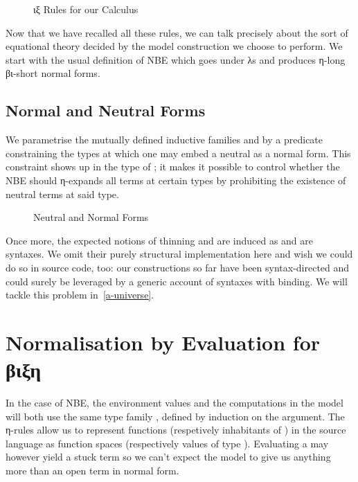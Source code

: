 \begin{figure}[h]
\caption{ιξ Rules for our Calculus\label{fig:iotaxirules}}
\end{figure}

Now that we have recalled all these rules, we can talk precisely about the
sort of equational theory decided by the model construction we choose to
perform. We start with the usual definition of NBE
which goes under λs and produces η-long βι-short normal forms.

\subsection{Normal and Neutral Forms}

We parametrise the mutually defined inductive families  and 
by a predicate  constraining the types at which one may embed a neutral
as a normal form. This constraint shows up in the type of ; it makes
it possible to control whether the NBE should η-expands all terms at certain
types by prohibiting the existence of neutral terms at said type.

\begin{figure}[h]
\caption{Neutral and Normal Forms}
\end{figure}

Once more, the expected notions of thinning  and
 are induced as  and  are syntaxes.
We omit their purely
structural implementation here and wish we could do so in source code,
too: our constructions so far have been syntax-directed and could
surely be leveraged by a generic account of syntaxes with binding.
We will tackle this problem in~\cref{a-universe}.

\section{Normalisation by Evaluation for βιξη}
\label{normbye}

In the case of NBE, the environment values and the computations in the model
will both use the same type family , defined by induction on the
 argument. The η-rules allow us to represent functions (respetively
inhabitants of ) in the source language as function spaces
(respectively values of type ). Evaluating a  may however
yield a stuck term so we can't expect the model to give us anything more than
an open term in normal form.

